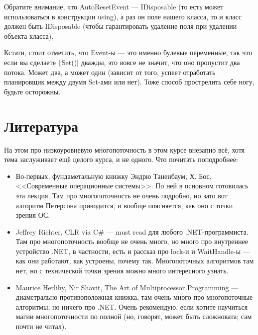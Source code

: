 \documentclass[a5paper]{article}
\begin{document}
Обратите внимание, что AutoResetEvent --- IDisposable (то есть может использоваться в конструкции using), а раз он поле нашего класса, то и класс должен быть IDisposable (чтобы гарантировать удаление поля при удалении объекта класса). 

Кстати, стоит отметить, что Event-ы --- это именно булевые переменные, так что если вы сделаете \texttt|Set()| дважды, это вовсе не значит, что оно пропустит два потока. Может два, а может один (зависит от того, успеет отработать планировщик между двумя Set-ами или нет). Тоже способ прострелить себе ногу, будьте осторожны.

\section{Литература}

На этом про низкоуровневую многопоточность в этом курсе внезапно всё, хотя тема заслуживает ещё целого курса, и не одного. Что почитать поподробнее:

\begin{itemize}
    \item Во-первых, фундаметальную книжку Эндрю Таненбаум, Х. Бос, <<Современные операционные системы>>. По ней в основном готовилась эта лекция. Там про многопоточность не очень подробно, но зато вот алгоритм Петерсона приводится, и вообще поясняется, как оно с точки зрения ОС.
    \item Jeffrey Richter, CLR via C\# --- must read для любого .NET-программиста. Там про многопоточность вообще не очень много, но много про внутреннее устройство .NET, в частности, есть и рассказ про lock-и и WaitHandle-ы --- как они работают, как устроены, почему так. Многопоточных алгоритмов там нет, но с технической точки зрения можно много интересного узнать.
    \item Maurice Herlihy, Nir Shavit, The Art of Multiprocessor Programming --- диаметрально противоположная книжка, там очень много про многопоточные алгоритмы, но ничего про .NET. Очень рекомендую, если хотите научиться магии многопоточности по полной (но, говорят, может быть сложновата; сам почти не читал).
\end{itemize}
\end{document}
